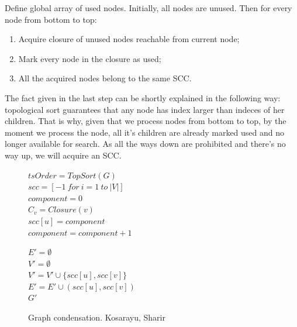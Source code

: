 \documentclass{svproc}
\begin{document}
Define global array of used nodes. Initially, all nodes are unused.
Then for every node from bottom to top:
\begin{enumerate}
    \item Acquire closure of unused nodes reachable from current node; 
    \item Mark every node in the closure as used;
    \item All the acquired nodes belong to the same SCC.
\end{enumerate}

The fact given in the last step can be shortly explained in the following way:
topological sort guarantees that any node has index larger than indeces of her children.
That is why, given that we process nodes from bottom to top, by the moment we process the node, all it's children are already marked used and no longer available for search.
As all the ways down are prohibited and there's no way up, we will acquire an SCC.

\begin{figure}[H]
	\begin{center}
		\begin{algorithm}[H]
			\SetAlgoLined
                        $tsOrder = TopSort(G)$ \\
                        $scc = [-1\ for\ i = 1\ to\ |V|] $ \\ 
                        $component = 0$ \\
                         {
                             {
                                $C_v = Closure(v)$ \\
                                 {
                                    $scc[u] = component$ \\
                                }
                                $component = component + 1$ \\
                            }
                        }

                        $E' = \emptyset$ \\
                        $V' = \emptyset$ \\
                         {
                             {
                               $V' = V' \cup \{scc[u], scc[v]\}$ \\ 
                               $E' = E' \cup (scc[u], scc[v])$ \\ 
                            }
                        }
                        \Return $G'$
			\label{alg:condensation}
			\caption{Graph condensation. Kosarayu, Sharir}
		\end{algorithm}
	\end{center}
\end{figure}
\end{document}
